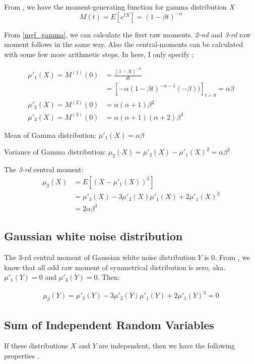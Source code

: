 \documentclass[conference]{IEEEtran}
\begin{document}
From \cite{richard1995}, we have the moment-generating function for gamma distribution \textit{X}
\begin{equation}
\label{mgf_gamma}
M(t) = E[e^{tX}] = {(1 - \beta t)}^{-\alpha}
\end{equation}

From \eqref{mgf_gamma}, we can calculate the first raw moments. \textit{2-nd} and \textit{3-rd} raw moment follows in the same way. Also the central-moments can be calculated with some few more arithmetic steps. In here, I only specify :

\begin{align}
\label{1st_raw_moments_gamma}
\mu'_{1}(X) =  M^{(1)}(0) &= \frac{{(1 - \beta t)}^{-\alpha}}{dt} \\
&= [-\alpha(1 - \beta t)^{-\alpha - 1} (-\beta))]_{t = 0} = \alpha \beta \\
\label{2nd_raw_moments_gamma}
\mu'_{2}(X) = M^{(2)}(0) &= \alpha (\alpha + 1) \beta^2 \\
\label{3rd_raw_moments_gamma}
\mu'_{3}(X) = M^{(3)}(0) &= \alpha (\alpha + 1) (\alpha + 2) \beta^3
\end{align}

Mean of Gamma distribution:
$\mu'_{1}(X) = \alpha \beta$

Variance of Gamma distribution:
$\mu_{2}(X) = \mu'_{2}(X) - \mu'_{1}(X)^2 = \alpha \beta^2$

The \textit{3-rd} central moment:
\begin{align*}
\mu_{3}(X) &= E[(X - \mu'_{1}(X))^3] \\
&= \mu'_{3}(X) - 3\mu'_{2}(X) \mu'_{1}(X) + 2 \mu'_{1}(X)^3 \\
&= 2 \alpha \beta^3
\end{align*}

\subsection{Gaussian white noise distribution}
The 3-rd central moment of Gaussian white noise distribution $Y$ is 0. From \cite{gut2005}, we know that all odd raw moment of symmetrical distribution is zero, aka. $\mu'_{1}(Y) = 0$ and $\mu'_{3}(Y) = 0$. Then:

\begin{align*}
\mu_{3}(Y) = \mu'_{3}(Y) - 3\mu'_{2}(Y) \mu'_{1}(Y) + 2 \mu'_{1}(Y)^3 = 0
\end{align*}

\subsection{Sum of Independent Random Variables}
If these distributions $X$ and $Y$ are independent, then we have the following properties \cite{gut2005}. 
\end{document}
